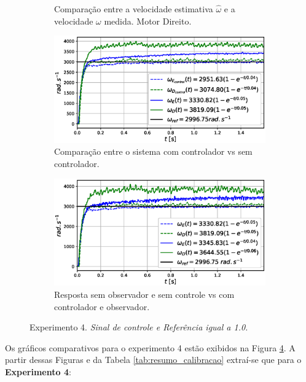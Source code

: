\begin{figure}[H]
\begin{subfigure}{.5\textwidth}
    \caption{Comparação entre a velocidade estimativa $\hat{\omega}$ e a velocidade $\omega$ medida. Motor Direito.}
    \label{fig:exp04:filtragem_direito}
    \end{subfigure}
    \hfill
    \begin{subfigure}{.5\textwidth}
    \centering
    \includegraphics[width=\textwidth]{figuras/resultados/exp04/controlador_vs_sem_controlador100.eps}
    \caption{Comparação entre o sistema com controlador vs sem controlador.}
    \label{fig:exp04:controle}
    \end{subfigure}
    \hfill
    \begin{subfigure}{.5\textwidth}
    \centering
    \includegraphics[width=\textwidth]{figuras/resultados/exp04/antes_vs_depois100.eps}
    \caption{Resposta sem observador e sem controle vs com controlador e observador.}
    \label{fig:exp04:antes_vs_depois}
    \end{subfigure}
    
    \caption{Experimento 4. \emph{Sinal de controle e Referência igual a 1.0.}}
    \label{fig:exp04_100}
\end{figure}

Os gráficos comparativos para o experimento 4 estão exibidos na Figura \ref{fig:exp04_100}. A partir dessas Figuras e da Tabela \ref{tab:resumo_calibracao} extraí-se que para o \textbf{Experimento 4}:

